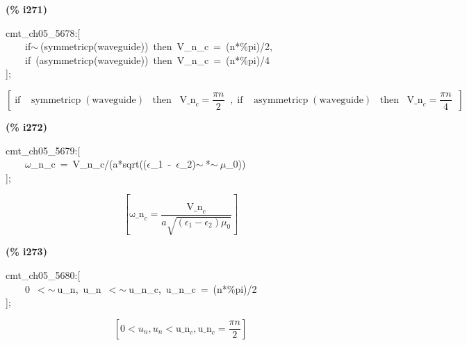 \documentclass[fleqn]{article}
\begin{document}
\noindent
\begin{minipage}[t]{4.000000em}\color{red}\bfseries
(\% i271)	
\end{minipage}
\begin{minipage}[t]{\textwidth}\color{blue}
cmt\_ch05\_5678:[\\
\ \ \ \ if\ensuremath{\sim\ }(symmetricp(waveguide))\ then\ V\_n\_c\ =\ (n*\%pi)/2,\\
\ \ \ \ if\ (asymmetricp(waveguide))\ then\ V\_n\_c\ =\ (n*\%pi)/4\\
];
\end{minipage}
\[\displaystyle \tag{\% o271} 
\operatorname{[}\operatorname{if}\operatorname{ }\operatorname{symmetricp}\left( \ensuremath{\mathrm{waveguide}}\right) \operatorname{ }\operatorname{then}\operatorname{ }{{\ensuremath{\mathrm{V\_ n}}}_c}=\frac{\ensuremath{\pi}  n}{2}\operatorname{ }\operatorname{,}\operatorname{if}\operatorname{ }\operatorname{asymmetricp}\left( \ensuremath{\mathrm{waveguide}}\right) \operatorname{ }\operatorname{then}\operatorname{ 
}{{\ensuremath{\mathrm{V\_ n}}}_c}=\frac{\ensuremath{\pi}  n}{4}\operatorname{ }\operatorname{]}\mbox{}
\]


\noindent
\begin{minipage}[t]{4.000000em}\color{red}\bfseries
(\% i272)	
\end{minipage}
\begin{minipage}[t]{\textwidth}\color{blue}
cmt\_ch05\_5679:[\\
\ \ \ \ \ensuremath{\omega}\_n\_c\ =\ V\_n\_c/(a*sqrt((\ensuremath{\epsilon}\_1\ -\ \ensuremath{\epsilon}\_2)\ensuremath{\sim\ }*\ensuremath{\sim\ }\ensuremath{\mu}\_0))\ \\
];
\end{minipage}
\[\displaystyle \tag{\% o272} 
\left[ {{\ensuremath{\mathrm{\omega \_ n}}}_c}=\frac{{{\ensuremath{\mathrm{V\_ n}}}_c}}{a \sqrt{\left( {{\epsilon }_1}-{{\epsilon }_2}\right)  {{\mu }_0}}}\right] \mbox{}
\]


\noindent
\begin{minipage}[t]{4.000000em}\color{red}\bfseries
(\% i273)	
\end{minipage}
\begin{minipage}[t]{\textwidth}\color{blue}
cmt\_ch05\_5680:[\\
\ \ \ \ 0\ \ensuremath{<}\ensuremath{\sim\ }u\_n,\ u\_n\ \ensuremath{<}\ensuremath{\sim\ }u\_n\_c,\ u\_n\_c\ =\ (n*\%pi)/2\\
];
\end{minipage}
\[\displaystyle \tag{\% o273} 
\left[ 0\operatorname{<  }{u_n}\operatorname{,}{u_n}\operatorname{<  }{{\ensuremath{\mathrm{u\_ n}}}_c}\operatorname{,}{{\ensuremath{\mathrm{u\_ n}}}_c}=\frac{\ensuremath{\pi}  n}{2}\right] \mbox{}
\]
\end{document}
